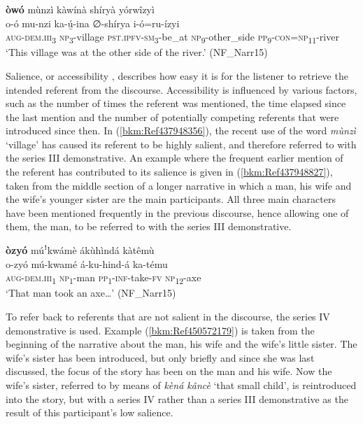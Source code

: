 \ex
\textbf{òwó} mùnzì kàwínà shíryà yórwîzyì\\
o-ó    mu-nzi  ka-ú̲-ina ∅-shírya    i-ó=ru-ízyi\\
\textsc{aug}-\textsc{dem}.\textsc{iii}\textsubscript{3}  \textsc{np}\textsubscript{3}-village  \textsc{pst}.\textsc{ipfv}-\textsc{sm}\textsubscript{3}-be\_at \textsc{np}\textsubscript{9}-other\_side  \textsc{pp}\textsubscript{9}-\textsc{con}=\textsc{np}\textsubscript{11}-river\\
\glt ‘This village was at the other side of the river.’ (NF\_Narr15)
\z\z

Salience, or accessibility \citep{Ariel2001}, describes how easy it is for the listener to retrieve the intended referent from the discourse. Accessibility is influenced by various factors, such as the number of times the referent was mentioned, the time elapsed since the last mention and the number of potentially competing referents that were introduced since then. In (\ref{bkm:Ref437948356}), the recent use of the word \textit{mùnzì} ‘village’ has caused its referent to be highly salient, and therefore referred to with the series III demonstrative. An example where the frequent earlier mention of the referent has contributed to its salience is given in (\ref{bkm:Ref437948827}), taken from the middle section of a longer narrative in which a man, his wife and the wife’s younger sister are the main participants. All three main characters have been mentioned frequently in the previous discourse, hence allowing one of them, the man, to be referred to with the series III demonstrative.

\ea
\label{bkm:Ref437948827}
\textbf{òzyó} múꜝkwámè ákùhìndá kàtêmù\\
\gll o-zyó    mú-kwamé  á-ku-hind-á    ka-tému\\
\textsc{aug}-\textsc{dem}.\textsc{iii}\textsubscript{1}  \textsc{np}\textsubscript{1}-man  \textsc{pp}\textsubscript{1}-\textsc{inf}-take-\textsc{fv}  \textsc{np}\textsubscript{12}-axe\\
\glt ‘That man took an axe…’ (NF\_Narr15)
\z

To refer back to referents that are not salient in the discourse, the series IV demonstrative is used. Example (\ref{bkm:Ref450572179}) is taken from the beginning of the narrative about the man, his wife and the wife’s little sister. The wife’s sister has been introduced, but only briefly and since she was last discussed, the focus of the story has been on the man and his wife. Now the wife’s sister, referred to by means of \textit{kèná kâncè} ‘that small child’, is reintroduced into the story, but with a series IV rather than a series III demonstrative as the result of this participant’s low salience.

